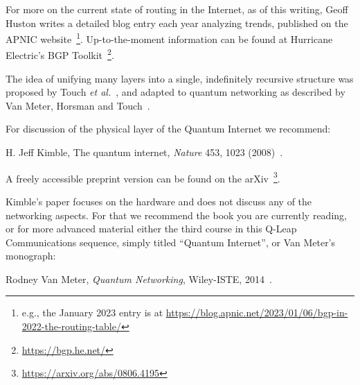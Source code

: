 For more on the current state of routing in the Internet, as of this writing, Geoff Huston writes a detailed blog entry each year analyzing trends, published on the APNIC website~\footnote{e.g., the January 2023 entry is at \url{https://blog.apnic.net/2023/01/06/bgp-in-2022-the-routing-table/}}. Up-to-the-moment information can be found at Hurricane Electric's BGP Toolkit~\footnote{\url{https://bgp.he.net/}}.

The idea of unifying many layers into a single, indefinitely recursive structure was proposed by Touch \emph{et al.}~\cite{touch2006recursive}, and adapted to quantum networking as described by Van Meter, Horsman and Touch~\cite{van-meter11:rqrn}.

For discussion of the physical layer of the Quantum Internet we recommend:

H. Jeff Kimble, The quantum internet, \emph{Nature} 453, 1023 (2008)~\cite{kimble08:_quant_internet}.

A freely accessible preprint version can be found on the arXiv~\footnote{\url{https://arxiv.org/abs/0806.4195}}.

Kimble’s paper focuses on the hardware and does not discuss any of the networking aspects. For that we recommend the book you are currently reading, or for more advanced material either the third course in this Q-Leap Communications sequence, simply titled ``Quantum Internet'', or Van Meter’s monograph:

Rodney Van Meter, \emph{Quantum Networking}, Wiley-ISTE, 2014~\cite{van-meter14:_quantum_networking}.
